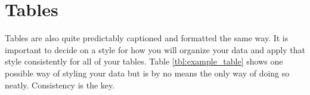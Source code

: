 \section{Tables}
	\label{sec:typesetting_tables}
	
	Tables are also quite predictably captioned and formatted the same way. It is important to decide on a style for how you will organize your data and apply that style consistently for all of your tables. Table \ref{tbl:example_table} shows one possible way of styling your data but is by no means the only way of doing so neatly. Consistency is the key. 
	
	

